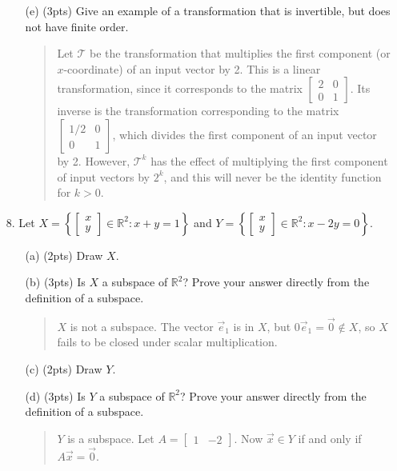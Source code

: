 \documentclass[11pt]{article}
\newcommand{\R}{\mathbb{R}}
\newcommand{\mat}[1]{\begin{bmatrix}#1\end{bmatrix}}
\newenvironment{answer}{\begin{quote}\sffamily}{\end{quote}}
\begin{document}
\begin{enumerate}
\begin{enumerate}
		\item[(e) (3pts)] Give an example of a transformation that is invertible, but does not have finite order.
		\begin{answer}
			Let $\mathcal{T}$ be the transformation that multiplies the first component (or $x$-coordinate) of an input vector by 2.  This is a linear transformation, since it corresponds to the matrix $\mat{2 & 0 \\ 0 & 1}$.  Its inverse is the transformation corresponding to the matrix $\mat{1/2 & 0 \\ 0 & 1}$, which divides the first component of an input vector by 2.  However, $\mathcal{T}^k$ has the effect of multiplying the first component of input vectors by $2^k$, and this will never be the identity function for $k>0$.
		\end{answer}
	\end{enumerate}

	\newpage
	\item[8.] Let $X=\left\{\mat{x\\y}\in\R^2:x+y=1\right\}$ and $Y=\left\{\mat{x\\y}\in\R^2:x-2y=0\right\}$.
	\begin{enumerate}
		\item[(a) (2pts)] Draw $X$.

		\item[(b) (3pts)] Is $X$ a subspace of $\R^2$?  Prove your answer directly from the definition of a subspace.
		\begin{answer}
			$X$ is not a subspace.  The vector $\vec e_1$ is in $X$, but $0\vec e_1=\vec 0\notin X$,
			so $X$ fails to be closed under scalar multiplication.
		\end{answer}
		\item[(c) (2pts)] Draw $Y$.

		\item[(d) (3pts)] Is $Y$ a subspace of $\R^2$?  Prove your answer directly from the definition of a subspace.
		\begin{answer}
			$Y$ is a subspace.  Let $A=\mat{1&-2}$.  Now $\vec x\in Y$ if and only if $A\vec x=\vec 0$.
			

\end{answer}
\end{enumerate}
\end{enumerate}
\end{document}
